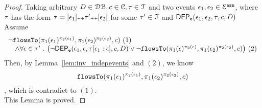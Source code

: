 \begin{proof}
	Taking arbitrary 
	$ D \in \mathcal{DB} , c \in \mathcal{C}, \mathtt{\tau} \in \mathcal{T} $ and two events 
	$\mathtt{\epsilon}_1, \mathtt{\epsilon}_2 \in \mathcal{E}^{\mathtt{{asn}}}$, where $\mathtt{\tau}$ has the form 
	$\mathtt{\tau} = [\mathtt{\epsilon}_1] {\scriptscriptstyle ++} \mathtt{\tau}' {\scriptscriptstyle ++} [\mathtt{\epsilon}_2]$ 
	for some 
	$\mathtt{\tau}' \in \mathcal{T}$ and $\mathsf{DEP_{\mathtt{e}}}(\mathtt{\epsilon}_1, \mathtt{\epsilon}_2, \mathtt{\tau}, c, D)$
	\\ 
	Assume 
	\[
		\begin{array}{l}
	\neg \flowsto(\pi_1(\event_1)^{\pi_2(\event_1)}, \pi_1(\event_2)^{\pi_2(\event_2)}, c) ~ (1)
	\\ \quad 
	\land 
	\forall \event \in \trace' \st 
	\left( 		
		\neg \eventdep(\event_1, \event, \trace[\event_1:\event], c, D)
	\lor 
		\neg \flowsto(\pi_1(\event)^{\pi_2(\event)}, \pi_1(\event_2)^{\pi_2(\event_2)}, c) 
	\right) ~ (2)
	\end{array}
	\]
	Then, by Lemma~\ref{lem:inv_indepevents} and $(2)$, we know 
	$$\mathtt{flowsTo}(\pi_1(\mathtt{\epsilon}_1)^{\pi_2(\mathtt{\epsilon}_1)}, \pi_1(\mathtt{\epsilon}_2)^{\pi_2(\mathtt{\epsilon}_2)}, c)$$
	, which is contradict to $(1)$.
	\\
	This Lemma is proved.
\end{proof}
%
%
%
%
